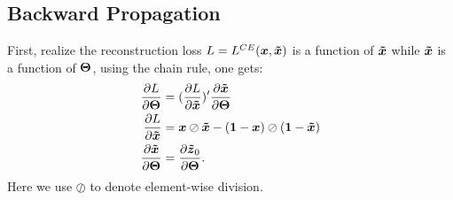 \subsection{Backward Propagation}
First, realize the reconstruction loss $L=L^{CE}(\xVO, \xVR)$ is a function of $\xVR$ while $\xVR$ is a function of $\Par$, using the chain rule, one gets:
\begin{equation*}
\begin{split}
  \PDV{L}{\Par} &= (\PDV{L}{\xVR})^{\prime} \PDV{\xVR}{\Par} \\
  \PDV{L}{\xVR} &= \xVO \oslash \xVR -  (\one{} - \xVO) \oslash (\one{} - \xVR) \\
  \PDV{\xVR}{\Par} &= \PDV{\zDC_0}{\Par}.
\end{split}
\end{equation*}
Here we use $\oslash$ to denote element-wise division.

